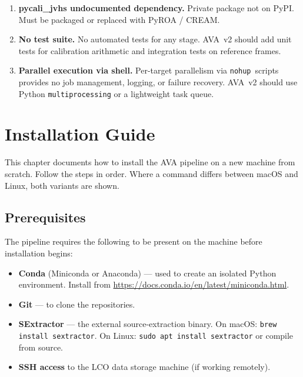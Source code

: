 \documentclass[12pt,a4paper]{article}
\begin{document}
\begin{enumerate}
\item \textbf{pycali\_jvhs undocumented dependency.}  Private package not on PyPI.
      Must be packaged or replaced with PyROA / CREAM.

\item \textbf{No test suite.}  No automated tests for any stage.  AVA~v2 should add
      unit tests for calibration arithmetic and integration tests on reference frames.

\item \textbf{Parallel execution via shell.}  Per-target parallelism via
      \texttt{nohup}~scripts provides no job management, logging, or failure recovery.
      AVA~v2 should use Python \texttt{multiprocessing} or a lightweight task queue.

\end{enumerate}


\section{Installation Guide}
\label{sec:install}

This chapter documents how to install the AVA pipeline on a new machine from
scratch.  Follow the steps in order.  Where a command differs between macOS
and Linux, both variants are shown.

\subsection{Prerequisites}

The pipeline requires the following to be present on the machine before
installation begins:

\begin{itemize}
  \item \textbf{Conda} (Miniconda or Anaconda) --- used to create an isolated
        Python environment.  Install from
        \url{https://docs.conda.io/en/latest/miniconda.html}.
  \item \textbf{Git} --- to clone the repositories.
  \item \textbf{SExtractor} --- the external source-extraction binary.
        On macOS: \texttt{brew install sextractor}.
        On Linux: \texttt{sudo apt install sextractor} or compile from source.
  \item \textbf{SSH access} to the LCO data storage machine (if working
        remotely).
\end{itemize}
\end{document}
